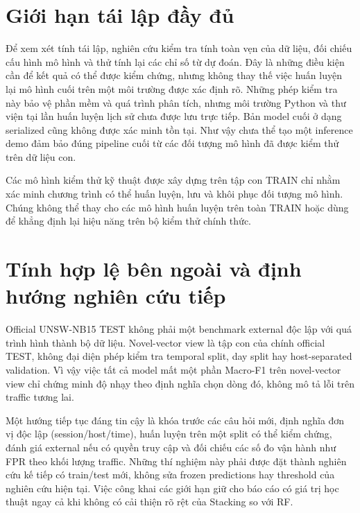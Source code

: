 \section{Giới hạn tái lập đầy đủ}
Để xem xét tính tái lập, nghiên cứu kiểm tra tính toàn vẹn của dữ liệu, đối chiếu cấu hình mô hình và thử tính lại các chỉ số từ dự đoán. Đây là những điều kiện cần để kết quả có thể được kiểm chứng, nhưng không thay thế việc huấn luyện lại mô hình cuối trên một môi trường được xác định rõ. Những phép kiểm tra này bảo vệ phần mềm và quá trình phân tích, nhưng môi trường Python và thư viện tại lần huấn luyện lịch sử chưa được lưu trực tiếp. Bản model cuối ở dạng serialized cũng không được xác minh tồn tại. Như vậy chưa thể tạo một inference demo đảm bảo đúng pipeline cuối từ các đối tượng mô hình đã được kiểm thử trên dữ liệu con.

Các mô hình kiểm thử kỹ thuật được xây dựng trên tập con TRAIN chỉ nhằm xác minh chương trình có thể huấn luyện, lưu và khôi phục đối tượng mô hình. Chúng không thể thay cho các mô hình huấn luyện trên toàn TRAIN hoặc dùng để khẳng định lại hiệu năng trên bộ kiểm thử chính thức.

\section{Tính hợp lệ bên ngoài và định hướng nghiên cứu tiếp}
Official UNSW-NB15 TEST không phải một benchmark external độc lập với quá trình hình thành bộ dữ liệu. Novel-vector view là tập con của chính official TEST, không đại diện phép kiểm tra temporal split, day split hay host-separated validation. Vì vậy việc tất cả model mất một phần Macro-F1 trên novel-vector view chỉ chứng minh độ nhạy theo định nghĩa chọn dòng đó, không mô tả lỗi trên traffic tương lai.

Một hướng tiếp tục đáng tin cậy là khóa trước các câu hỏi mới, định nghĩa đơn vị độc lập (session/host/time), huấn luyện trên một split có thể kiểm chứng, đánh giá external nếu có quyền truy cập và đối chiếu các số đo vận hành như FPR theo khối lượng traffic. Những thí nghiệm này phải được đặt thành nghiên cứu kế tiếp có train/test mới, không sửa frozen predictions hay threshold của nghiên cứu hiện tại. Việc công khai các giới hạn giữ cho báo cáo có giá trị học thuật ngay cả khi không có cải thiện rõ rệt của Stacking so với RF.

